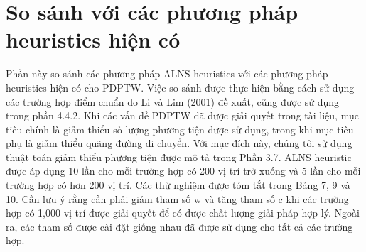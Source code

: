 \section{So sánh với các phương pháp heuristics hiện có}
Phần này so sánh các phương pháp ALNS heuristics với các phương pháp heuristics hiện có cho PDPTW. Việc so sánh được thực hiện bằng cách sử dụng các trường hợp điểm chuẩn do Li và Lim (2001) đề xuất, cũng được sử dụng trong phần 4.4.2. Khi các vấn đề PDPTW đã được giải quyết trong tài liệu, mục tiêu chính là giảm thiểu số lượng phương tiện được sử dụng, trong khi mục tiêu phụ là giảm thiểu quãng đường di chuyển. Với mục đích này, chúng tôi sử dụng thuật toán giảm thiểu phương tiện được mô tả trong Phần 3.7. ALNS heuristic được áp dụng 10 lần cho mỗi trường hợp có 200 vị trí trở xuống và 5 lần cho mỗi trường hợp có hơn 200 vị trí. Các thử nghiệm được tóm tắt trong Bảng 7, 9 và 10. Cần lưu ý rằng cần phải giảm tham số w và tăng tham số c khi các trường hợp có 1,000 vị trí được giải quyết để có được chất lượng giải pháp hợp lý. Ngoài ra, các tham số được cài đặt giống nhau đã được sử dụng cho tất cả các trường hợp.

